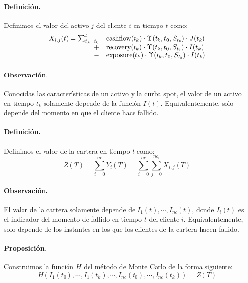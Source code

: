\paragraph{Definici\'on.} Definimos el valor del activo $j$ del cliente $i$ en 
tiempo $t$ como:
\begin{displaymath}
\begin{array}{rl}
X_{i,j}(t) = \sum_{t_k=t_0}^{t} & \textrm{cashflow}(t_k) \cdot \Upsilon(t_k,t_0, S_{t_0}) \cdot J(t_k) \cr
+ &\textrm{recovery}(t_k) \cdot \Upsilon(t_k,t_0, S_{t_0}) \cdot I(t_k) \cr
- &\textrm{exposure}(t_k) \cdot \Upsilon(t_k,t_0, S_{t_0}) \cdot I(t_k)  
\end{array}
\end{displaymath}

\paragraph{Observaci\'on.} Conocidas las características de un activo y 
la curba spot, el valor de un activo en tiempo $t_k$ solamente depende de 
la funci\'on $I(t)$. Equivalentemente, solo depende del momento en que el
cliente hace fallido.

\paragraph{Definici\'on.} Definimos el valor de la cartera en tiempo $t$ como:
\begin{displaymath}
Z(T) = \sum_{i=0}^{nc} Y_i(T) = \sum_{i=0}^{nc} \sum_{j=0}^{na_i} X_{i,j}(T)
\end{displaymath}

\paragraph{Observaci\'on.} El valor de la cartera solamente depende de 
$I_1(t), \cdots, I_{nc}(t)$, donde $I_i(t)$ es el indicador del momento 
de fallido en tiempo $t$ del cliente $i$. Equivalentemente, solo depende 
de los instantes en los que los clientes de la cartera hacen fallido.

\paragraph{Proposici\'on.} Construimos la funci\'on $H$ del m\'etodo de Monte 
Carlo de la forma siguiente:
\begin{displaymath}
H(I_1(t_0),\cdots,I_1(t_k),\cdots,I_{nc}(t_0),\cdots,I_{nc}(t_k)) = Z(T)
\end{displaymath}


